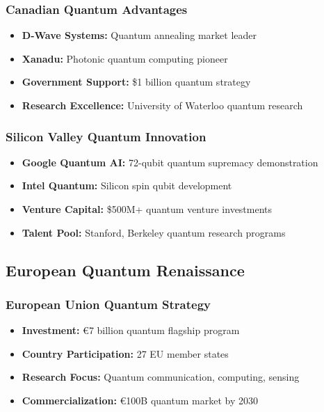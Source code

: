 \documentclass[12pt,a4paper]{article}
\begin{document}
\subsubsection{Canadian Quantum Advantages}
\begin{itemize}
    \item \textbf{D-Wave Systems:} Quantum annealing market leader
    \item \textbf{Xanadu:} Photonic quantum computing pioneer
    \item \textbf{Government Support:} \$1 billion quantum strategy
    \item \textbf{Research Excellence:} University of Waterloo quantum research
\end{itemize}

\subsubsection{Silicon Valley Quantum Innovation}
\begin{itemize}
    \item \textbf{Google Quantum AI:} 72-qubit quantum supremacy demonstration
    \item \textbf{Intel Quantum:} Silicon spin qubit development
    \item \textbf{Venture Capital:} \$500M+ quantum venture investments
    \item \textbf{Talent Pool:} Stanford, Berkeley quantum research programs
\end{itemize}

\subsection{European Quantum Renaissance}

\subsubsection{European Union Quantum Strategy}
\begin{itemize}
    \item \textbf{Investment:} €7 billion quantum flagship program
    \item \textbf{Country Participation:} 27 EU member states
    \item \textbf{Research Focus:} Quantum communication, computing, sensing
    \item \textbf{Commercialization:} €100B quantum market by 2030
\end{itemize}
\end{document}
